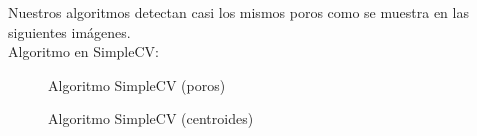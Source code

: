 Nuestros algoritmos detectan casi los mismos poros como se muestra en las siguientes imágenes. \\
Algoritmo en SimpleCV:\@

    \begin{figure}[H]
      \caption{Algoritmo SimpleCV (poros)}
      \centering \setlength\fboxsep{0pt} \setlength\fboxrule{0.5pt}
    \end{figure}

    \begin{figure}[H]
      \caption{Algoritmo SimpleCV (centroides)}
      \centering \setlength\fboxsep{0pt} \setlength\fboxrule{0.5pt}
    \end{figure}

